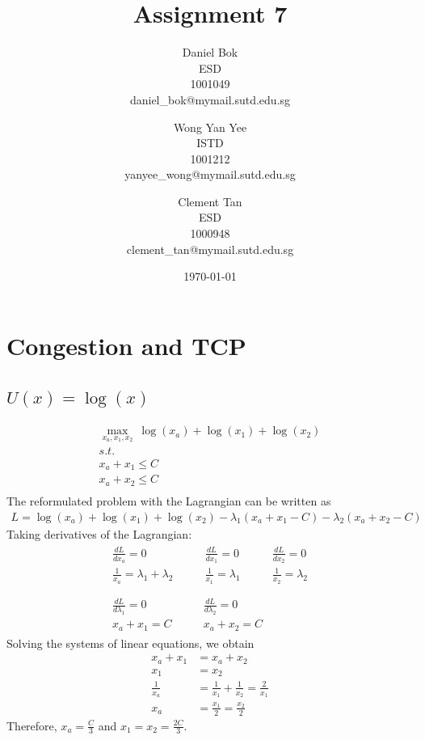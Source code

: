 \documentclass[]{article}
\title{Assignment 7}
\author{
	Daniel Bok \\
	ESD \\
	1001049 \\
	daniel\_bok@mymail.sutd.edu.sg 
	\and
	Wong Yan Yee\\ 
	ISTD \\
	1001212 \\
	yanyee\_wong@mymail.sutd.edu.sg
	\and
	Clement Tan \\
	ESD \\
	1000948 \\
	clement\_tan@mymail.sutd.edu.sg
}
\date{\today}
\newcommand{\e}{&=}
\begin{document}
	
\maketitle
	
\section{Congestion and TCP}

\subsection{$U(x) = \log(x)$}
\begin{gather*}
\underset{x_a, x_1, x_2}{\max}\ \log(x_a) + \log(x_1) + \log(x_2) \\
s.t. \\
x_a + x_1 \leq C \\
x_a + x_2 \leq C \\
\end{gather*}
The reformulated problem with the Lagrangian can be written as
\begin{gather*}
L = \log(x_a) + \log(x_1) + \log(x_2) - \lambda_1(x_a + x_1 - C) - \lambda_2(x_a + x_2 - C) 
\end{gather*}
Taking derivatives of the Lagrangian:
\begin{gather*}
\begin{split}
\frac{dL}{dx_a} = 0 \\
\frac{1}{x_a} = \lambda_1 + \lambda_2
\end{split} \qquad 
\begin{split}
\frac{dL}{dx_1} = 0 \\
\frac{1}{x_1} = \lambda_1
\end{split} \qquad
\begin{split}
\frac{dL}{dx_2} = 0 \\
\frac{1}{x_2} = \lambda_2
\end{split} \\\\
\begin{split}
\frac{dL}{d\lambda_1} = 0 \\
x_a + x_1 = C
\end{split} \qquad
\begin{split}
\frac{dL}{d\lambda_2} = 0 \\
x_a + x_2 = C
\end{split}
\end{gather*}
Solving the systems of linear equations, we obtain
\begin{align*}
x_a + x_1 \e x_a + x_2 \\
x_1 \e x_2 \\
\frac{1}{x_a} \e \frac{1}{x_1} + \frac{1}{x_2} = \frac{2}{x_1} \\
x_a \e \frac{x_1}{2} = \frac{x_2}{2}
\end{align*}
Therefore, $x_a = \frac{C}{3}$ and $x_1 = x_2 = \frac{2C}{3}$.
	
\end{document}
